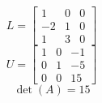 \[
L=\left[
\begin{array}{ccc}
1 & 0 & 0 \\
-2 & 1 & 0\\
1 & 3 & 0
\end{array}\right]
\]\[
U=\left[
\begin{array}{ccc}
1 & 0 & -1 \\
0 & 1 & -5\\
0 & 0 & 15
\end{array}\right]
\]
\[ \det(A)=15 \]
